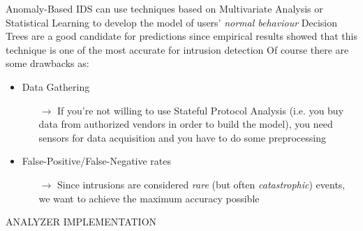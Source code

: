 	\begin{frame}
		Anomaly-Based IDS can use techniques based on Multivariate Analysis or Statistical Learning to develop the model of users' \emph{normal behaviour}\newline\newline
		Decision Trees are a good candidate for predictions since empirical results showed that this technique is one of the most accurate for intrusion detection\newline\newline
		Of course there are some drawbacks as:
		\begin{itemize}
			\item Data Gathering
			\begin{itemize}
				\item[$\rightarrow$] If you're not willing to use Stateful Protocol Analysis (i.e. you buy data from authorized vendors in order to build the model), you need sensors for data acquisition and you have to do some preprocessing
			\end{itemize}
			\item False-Positive/False-Negative rates
			\begin{itemize}
				\item[$\rightarrow$] Since intrusions are considered \emph{rare} (but often \emph{catastrophic}) events, we want to achieve the maximum accuracy possible
			\end{itemize}
		\end{itemize}
	\end{frame}
	
	\begin{frame}
		\begin{center}
			\begin{Huge}
				ANALYZER IMPLEMENTATION
			\end{Huge}
		\end{center}
	\end{frame}
	

